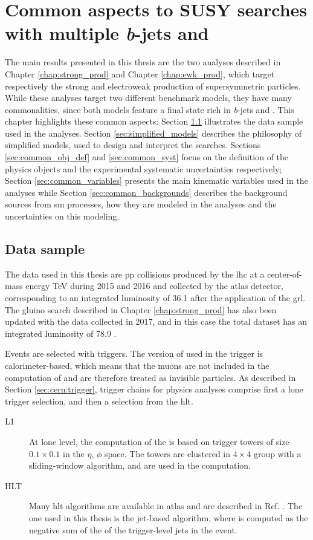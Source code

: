 \chapter{Common aspects to SUSY searches with multiple \textit{b}-jets and \met}
\label{chap:multib_general}

The main results presented in this thesis are the two analyses described in Chapter \ref{chap:strong_prod} and Chapter \ref{chap:ewk_prod}, which target respectively the strong and electroweak production of supersymmetric particles.
While these analyses target two different benchmark models, they have many commonalities, since both models feature 
a final state rich in \textit{b}-jets and \met. This chapter highlights these common aspects: 
Section \ref{sec:common:datasample} illustrates the data sample used in the analyses. 
Section \ref{sec:simplified_models} describes the philosophy of simplified models, used to design and interpret the searches. 
Sections \ref{sec:common_obj_def} and \ref{sec:common_syst} focus on the definition of the physics objects and the experimental systematic uncertainties respectively; Section \ref{sec:common_variables} presents the main kinematic variables used in the analyses 
while Section \ref{sec:common_backgrounds} describes the background sources from \gls{sm} processes, 
how they are modeled in the analyses and the uncertainties on this modeling. 


\section{Data sample}
\label{sec:common:datasample}

The data used in this thesis are \gls{pp} collisions produced by the \gls{lhc} 
at a center-of-mass energy \cmtre TeV during 2015 and 2016 
and collected by the \gls{atlas} detector, corresponding to an integrated luminosity of 36.1 \ifb 
after the application of the \gls{grl}. 
The gluino search described in Chapter \ref{chap:strong_prod} has also been updated with the data collected in 
2017, and in this case the total dataset has an integrated luminosity of 78.9 \ifb. 

Events are selected with \met triggers. 
The version of \met used in the trigger is calorimeter-based, which means that the muons are not included in the computation of \met and are 
therefore treated as invisible particles.  As described in Section \ref{sec:cern:trigger}, 
trigger chains for physics analyses comprise first a \gls{lone} trigger selection, and then a selection from the \gls{hlt}.
\begin{description}
\item[L1] At \gls{lone} level, the computation of the \met is based on trigger towers of size $0.1\times0.1$ in the $\eta$, $\phi$ space. The towers are clustered in $4\times4$ group with a sliding-window algorithm, and are used in the \met computation.
\item[HLT] Many \gls{hlt} \met algorithms are available in \gls{atlas} and are described in Ref. \cite{Aaboud:2016leb}. 
The one used in this thesis is the jet-based algorithm, where \met is computed as the negative sum of the \pt of the trigger-level jets in the event. 
\end{description}

